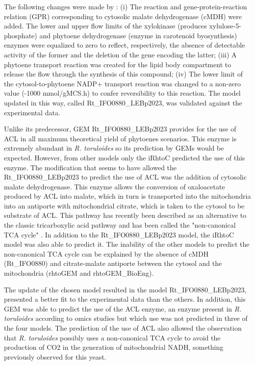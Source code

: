 The following changes were made by \cite{DeBiaggi2023}: (i) The reaction and gene-protein-reaction relation (GPR) corresponding to cytosolic malate dehydrogenase (cMDH) were added. The lower and upper 
flow limits of the xylokinase (produces xylulose-5-phosphate) and phytoene dehydrogenase (enzyme in carotenoid byosynthesis) enzymes were equalized to zero to reflect, respectively, 
the absence of detectable activity of the former and the deletion of the gene encoding the latter; 
(iii) A phytoene transport reaction was created for the lipid body compartment to release the flow through the synthesis of this compound; 
(iv) The lower limit of the cytosol-to-phytoene NADP+ transport reaction was changed to a non-zero value (-1000 mmol/gMCS.h) 
to confer reversibility to this reaction. The model updated in this way, called Rt\_IFO0880\_LEBp2023, 
was validated against the experimental data. \cite{DeBiaggi2023}

Unlike its predecessor, GEM Rt\_IFO0880\_LEBp2023 provides for the use of ACL in all maximum theoretical yield of phytoenes scenarios.
This enzyme is extremely abundant in \textit{R. toruloides} 
\cite{Zhu2012} so its prediction by GEMs would be expected. However, from other models only the iRhtoC predicted the use of this enzyme. 
The modification that seems to have allowed the Rt\_IFO0880\_LEBp2023 to predict 
the use of ACL was the addition of cytosolic malate dehydrogenase. This enzyme allows the conversion of oxaloacetate produced by ACL into malate, which in turn is 
transported into the mitochondria into an antiporte with mitochondrial citrate, which is taken to the cytosol to be substrate of ACL. This pathway has recently 
been described as an alternative to the classic 
tricarboxylic acid pathway and has been called the "non-canonical TCA cycle" \cite{Arnold2022}. In addition to the
Rt\_IFO0880\_LEBp2023 model, the iRhtoC model was also able to predict it. The inability of the other models to predict the non-canonical TCA cycle can be explained by the absence of cMDH (Rt\_IFO0880) and citrate-malate antiporte 
between the cytosol and the mitochondria (rhtoGEM and rhtoGEM\_BioEng). \cite{DeBiaggi2023}

The update of the chosen model resulted in the model Rt\_IFO0880\_LEBp2023, presented a better fit to the experimental data
than the others. In addition, this GEM was able to predict the use of the ACL enzyme, an enzyme present in \textit{R. toruloides} according to omics studies \cite{Zhu2012}
but which use was not predicted in three of the four models. 
The prediction of the use of ACL also allowed the observation that \textit{R. toruloides} possibly uses a non-canonical TCA cycle to avoid the production of CO2 in 
the generation of mitochondrial NADH, something previously observed for this yeast. \cite{DeBiaggi2023}

